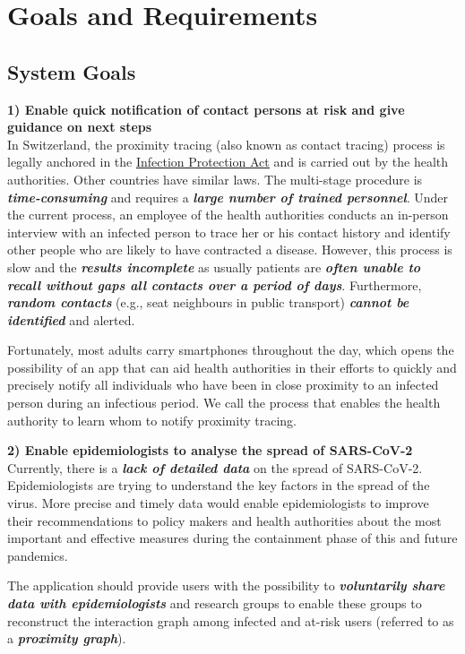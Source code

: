 \documentclass[12pt,a4paper]{article}
\begin{document}
\section*{Goals and Requirements}
\subsection*{System Goals}
\textbf{1) Enable quick notification of contact persons at risk and give guidance on next
steps}\\
In Switzerland, the proximity tracing (also known as contact tracing) process is legally
anchored in the \href{http://www.rki.de}{\underline{Infection Protection Act}} and is carried out by the health authorities. Other countries have similar laws. The multi-stage procedure is \textbf{\textit{time-consuming}} and requires a \textbf{\textit{large number of trained personnel}}. Under the current process, an employee of the health authorities conducts an in-person interview with an infected person to trace her or his contact history and identify other people who are likely to have contracted a disease. However, this process is slow and the \textbf{\textit{results incomplete}} as usually patients are \textbf{\textit{often unable to recall without gaps all contacts over a period of days}}. Furthermore, \textbf{\textit{random contacts}} (e.g., seat neighbours in public transport) \textbf{\textit{cannot be identified}}  and alerted.

Fortunately, most adults carry smartphones throughout the day, which opens the possibility
of an app that can aid health authorities in their efforts to quickly and precisely notify all individuals who have been in close proximity to an infected person during an infectious period. We call the process that enables the health authority to learn whom to notify proximity tracing.

\textbf{2) Enable epidemiologists to analyse the spread of SARS-CoV-2}\\
Currently, there is a \textbf{\textit{lack of detailed data}} on the spread of SARS-CoV-2. Epidemiologists
are trying to understand the key factors in the spread of the virus. More precise and timely
data would enable epidemiologists to improve their recommendations to policy makers and
health authorities about the most important and effective measures during the containment
phase of this and future pandemics.

The application should provide users with the possibility to \textbf{\textit{voluntarily share data with epidemiologists}} and research groups to enable these groups to reconstruct the interaction graph among infected and at-risk users (referred to as a \textbf{\textit{proximity graph}}).
\end{document}
